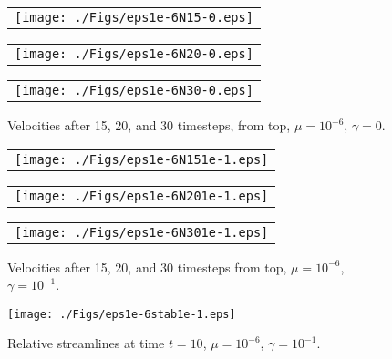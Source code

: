 \documentclass[10pt]{amsart}
\numberwithin{equation}{section}
\theoremstyle{definition}
\theoremstyle{remark}
\renewcommand{\(}{\bigl(}
\renewcommand{\)}{\bigr)}
\begin{document}
 \begin{figure}[ht]
 \begin{tabular}{@{}c@{}}
   \texttt{[image: ./Figs/eps1e-6N15-0.eps]}\\
  \end{tabular}
  
\vspace{-1.5cm}

 \begin{tabular}{@{}c@{}}
   \texttt{[image: ./Figs/eps1e-6N20-0.eps]}\\
  \end{tabular}
  
\vspace{-2cm}

 \begin{tabular}{@{}c@{}}
   \texttt{[image: ./Figs/eps1e-6N30-0.eps]}\\
  \end{tabular}
		
	\caption{Velocities after 15, 20, and 30 timesteps, from top, $\mu=10^{-6}$, $\gamma = 0$.}
	\label{fig:velunstab}
\end{figure}
 \begin{figure}[ht]
 \begin{tabular}{@{}c@{}}
   \texttt{[image: ./Figs/eps1e-6N151e-1.eps]}\\
  \end{tabular}
  
\vspace{-1.5cm}

 \begin{tabular}{@{}c@{}}
   \texttt{[image: ./Figs/eps1e-6N201e-1.eps]}\\
  \end{tabular}
  
\vspace{-2cm}

 \begin{tabular}{@{}c@{}}
   \texttt{[image: ./Figs/eps1e-6N301e-1.eps]}\\
  \end{tabular}
		
	\caption{Velocities after 15, 20, and 30 timesteps from top, $\mu=10^{-6}$, $\gamma = 10^{-1}$.}
	\label{fig:velstab}
\end{figure}
\begin{figure}[ht]
	\begin{center}
		\texttt{[image: ./Figs/eps1e-6stab1e-1.eps]}
	\end{center}
	\caption{Relative streamlines at time $t=10$, $\mu =10^{-6}$, $\gamma = 10^{-1}$.}
	\label{fig:vort1e-6}
\end{figure}
\end{document}
